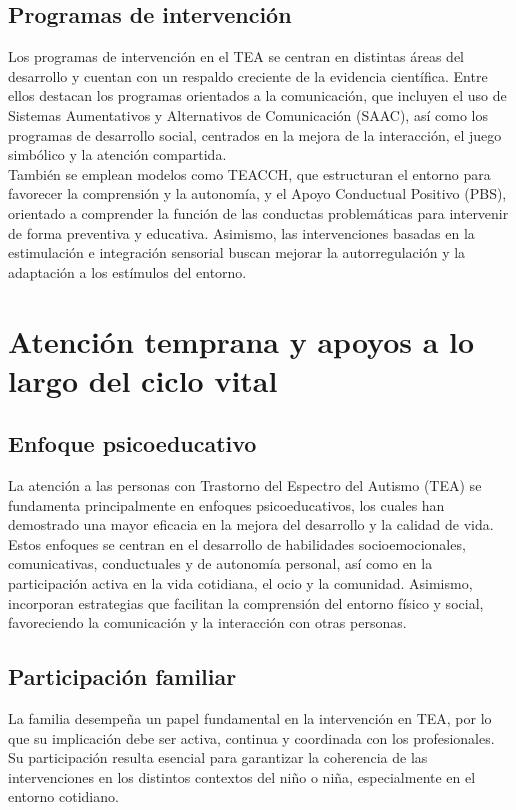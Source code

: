 \documentclass{article}
\begin{document}
\subsection{\textbf{Programas de intervención}}
Los programas de intervención en el TEA se centran en distintas áreas del desarrollo y cuentan con un respaldo creciente de la evidencia científica. Entre ellos destacan los programas orientados a la comunicación, que incluyen el uso de Sistemas Aumentativos y Alternativos de Comunicación (SAAC), así como los programas de desarrollo social, centrados en la mejora de la interacción, el juego simbólico y la atención compartida.\\

También se emplean modelos como TEACCH, que estructuran el entorno para favorecer la comprensión y la autonomía, y el Apoyo Conductual Positivo (PBS), orientado a comprender la función de las conductas problemáticas para intervenir de forma preventiva y educativa. Asimismo, las intervenciones basadas en la estimulación e integración sensorial buscan mejorar la autorregulación y la adaptación a los estímulos del entorno.


\section{\textbf{Atención temprana y apoyos a lo largo del ciclo vital}}
\subsection{\textbf{Enfoque psicoeducativo}}
La atención a las personas con Trastorno del Espectro del Autismo (TEA) se fundamenta principalmente en enfoques psicoeducativos, los cuales han demostrado una mayor eficacia en la mejora del desarrollo y la calidad de vida.\\

Estos enfoques se centran en el desarrollo de habilidades socioemocionales, comunicativas, conductuales y de autonomía personal, así como en la participación activa en la vida cotidiana, el ocio y la comunidad. Asimismo, incorporan estrategias que facilitan la comprensión del entorno físico y social, favoreciendo la comunicación y la interacción con otras personas.

\subsection{\textbf{Participación familiar}}
La familia desempeña un papel fundamental en la intervención en TEA, por lo que su implicación debe ser activa, continua y coordinada con los profesionales. Su participación resulta esencial para garantizar la coherencia de las intervenciones en los distintos contextos del niño o niña, especialmente en el entorno cotidiano.\\
\end{document}
